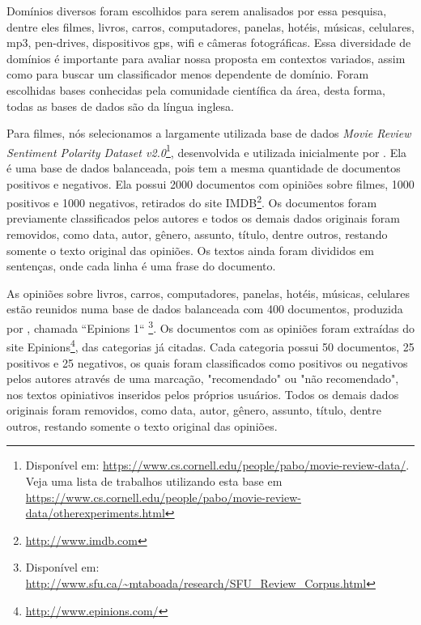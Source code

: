 \documentclass[template.tex]{subfiles}
\begin{document}
Domínios diversos foram escolhidos para serem analisados por essa pesquisa, dentre eles filmes, livros, carros, computadores, panelas, hotéis, músicas, celulares, mp3, pen-drives, dispositivos gps, wifi e câmeras fotográficas. Essa diversidade de domínios é importante para avaliar nossa proposta em contextos variados, assim como para buscar um classificador menos dependente de domínio. Foram escolhidas bases conhecidas pela comunidade científica da área, desta forma, todas as bases de dados são da língua inglesa.

Para filmes, nós selecionamos a largamente utilizada base de dados \textit{Movie Review Sentiment Polarity Dataset v2.0}\footnote{Disponível em: \url{https://www.cs.cornell.edu/people/pabo/movie-review-data/}. Veja uma lista de trabalhos utilizando esta base em \url{https://www.cs.cornell.edu/people/pabo/movie-review-data/otherexperiments.html}}, desenvolvida e utilizada inicialmente por . Ela é uma base de dados balanceada, pois tem a mesma quantidade de documentos positivos e negativos. Ela possui 2000 documentos com opiniões sobre filmes, 1000 positivos e 1000 negativos, retirados do site IMDB\footnote{\url{http://www.imdb.com}}. Os documentos foram previamente classificados pelos autores e todos os demais dados originais foram removidos, como data, autor, gênero, assunto, título, dentre outros, restando somente o texto original das opiniões. Os textos ainda foram divididos em sentenças, onde cada linha é uma frase do documento.

As opiniões sobre livros, carros, computadores, panelas, hotéis, músicas, celulares estão reunidos numa base de dados balanceada com 400 documentos,  produzida por , chamada ``Epinions 1`` \footnote{Disponível em: \url{http://www.sfu.ca/~mtaboada/research/SFU_Review_Corpus.html}}. Os documentos com as opiniões foram extraídas do site Epinions\footnote{\url{http://www.epinions.com/}}, das categorias já citadas. Cada categoria possui 50 documentos, 25 positivos e 25 negativos, os quais foram classificados como positivos ou negativos pelos autores através de uma marcação, "recomendado" ou "não recomendado", nos textos opiniativos inseridos pelos próprios usuários. Todos os demais dados originais foram removidos, como data, autor, gênero, assunto, título, dentre outros, restando somente o texto original das opiniões.
\end{document}
